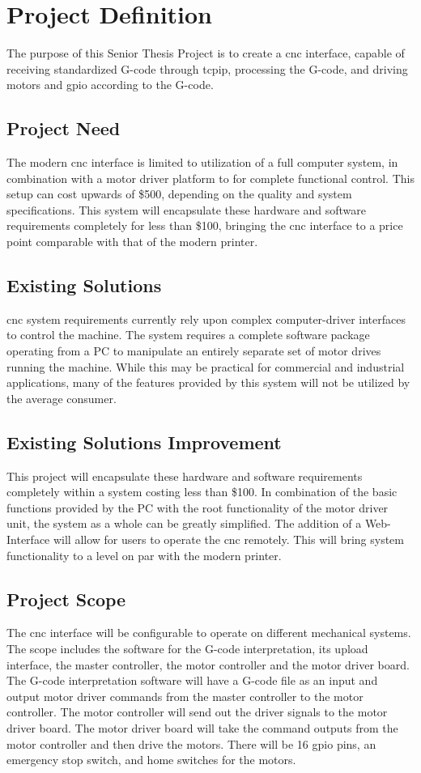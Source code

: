 \chapter{Project Definition}
The purpose of this Senior Thesis Project is to create a \gls{cnc} interface, capable of receiving standardized G-code through \gls{tcpip}, processing the G-code, and driving motors and \gls{gpio} according to the G-code. 

\section{Project Need}
The modern \gls{cnc} interface is limited to utilization of a full computer system, in combination with a motor driver platform to for complete functional control.
This setup can cost upwards of \$500, depending on the quality and system specifications.
This system will encapsulate these hardware and software requirements completely for less than \$100, bringing the \gls{cnc} interface to a price point comparable with that of the modern printer. 

\section{Existing Solutions}
\gls{cnc} system requirements currently rely upon complex computer-driver interfaces to control the machine.
The system requires a complete software package operating from a PC to manipulate an entirely separate set of motor drives running the machine.
While this may be practical for commercial and industrial applications, many of the features provided by this system will not be utilized by the average consumer.

\section{Existing Solutions Improvement}
This project will encapsulate these hardware and software requirements completely within a system costing less than \$100.
In combination of the basic functions provided by the PC with the root functionality of the motor driver unit, the system as a whole can be greatly simplified.
The addition of a Web-Interface will allow for users to operate the \gls{cnc} remotely.
This will bring system functionality to a level on par with the modern printer.

\section{Project Scope}
The \gls{cnc} interface will be configurable to operate on different mechanical systems. 
The scope includes the software for the G-code interpretation, its upload interface, the master controller, the motor controller and the motor driver board.
The G-code interpretation software will have a G-code file as an input and output motor driver commands from the master controller to the motor controller.
The motor controller will send out the driver signals to the motor driver board. 
The motor driver board will take the command outputs from the motor controller and then drive the motors. 
There will be 16 \gls{gpio} pins, an emergency stop switch, and home switches for the motors. 

